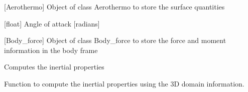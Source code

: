 \documentclass[letterpaper,10pt,english]{sphinxmanual}
\begin{document}
\begin{fulllineitems}

\begin{fulllineitems}
\label{\detokenize{modules:assembly.Assembly.aerothermo}}
\pysigstartsignatures
{}
\pysigstopsignatures
\sphinxAtStartPar
{[}Aerothermo{]} Object of class Aerothermo to store the surface quantities

\end{fulllineitems}


\begin{fulllineitems}
\label{\detokenize{modules:assembly.Assembly.aoa}}
\pysigstartsignatures
{}
\pysigstopsignatures
\sphinxAtStartPar
{[}float{]} Angle of attack {[}radians{]}

\end{fulllineitems}


\begin{fulllineitems}
\label{\detokenize{modules:assembly.Assembly.body_force}}
\pysigstartsignatures
{}
\pysigstopsignatures
\sphinxAtStartPar
{[}Body\_force{]} Object of class Body\_force to store the force and moment information in the body frame

\end{fulllineitems}


\begin{fulllineitems}
\label{\detokenize{modules:assembly.Assembly.compute_mass_properties}}
\pysigstartsignatures
{}
\pysigstopsignatures
\sphinxAtStartPar
Computes the inertial properties

\sphinxAtStartPar
Function to compute the inertial properties using the 3D domain information.

\end{fulllineitems}


\end{fulllineitems}
\end{document}
